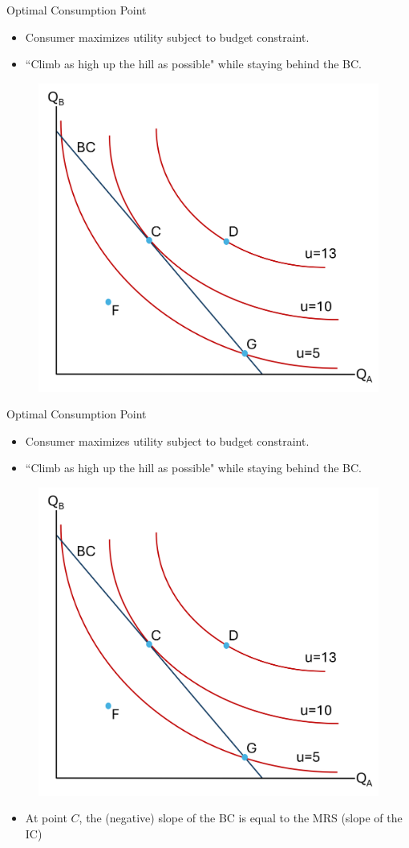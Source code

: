 \documentclass[9pt, handout]{beamer}
\begin{document}
\begin{frame}{Optimal Consumption Point}
    \begin{itemize}
        \item Consumer maximizes utility subject to budget constraint.
        \item ``Climb as high up the hill as possible" while staying behind the BC.
    \end{itemize}
    \begin{figure}
        \centering
        \includegraphics[width=0.5\linewidth]{optimum.png}
    \end{figure}
\end{frame}

\begin{frame}{Optimal Consumption Point}
    \begin{itemize}
        \item Consumer maximizes utility subject to budget constraint.
        \item ``Climb as high up the hill as possible" while staying behind the BC.
    \end{itemize}
    \begin{figure}
        \centering
        \includegraphics[width=0.5\linewidth]{optimum.png}
    \end{figure}
    \begin{itemize}
        \item<2-> At point $C$, the (negative) slope of the BC is equal to the MRS (slope of the IC)
    \end{itemize}
\end{frame}
\end{document}
